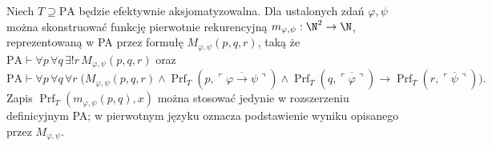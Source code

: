 \begin{lemat}\label{lem:xi-formal-mp}
Niech $T\supseteq\mathrm{PA}$ będzie efektywnie
aksjomatyzowalna. Dla ustalonych zdań $\varphi,\psi$
można skonstruować funkcję pierwotnie rekurencyjną
$m_{\varphi,\psi}:\N^2\to\N$, reprezentowaną w PA
przez formułę $M_{\varphi,\psi}(p,q,r)$, taką że
$\mathrm{PA}\vdash\forall p\,\forall q\,\exists!r\,
M_{\varphi,\psi}(p,q,r)$ oraz
\[
\mathrm{PA}\vdash\forall p\,\forall q\,\forall r\;\bigl(
 M_{\varphi,\psi}(p,q,r)\land
\operatorname{Prf}_T(p,\overline{\ulcorner\varphi\to\psi\urcorner})
\land\operatorname{Prf}_T(q,\overline{\ulcorner\varphi\urcorner})
\to\operatorname{Prf}_T(r,
\overline{\ulcorner\psi\urcorner})\bigr).
\]
Zapis $\operatorname{Prf}_T(m_{\varphi,\psi}(p,q),x)$
można stosować jedynie w rozszerzeniu definicyjnym PA;
w pierwotnym języku oznacza podstawienie wyniku opisanego
przez $M_{\varphi,\psi}$.
\end{lemat}
